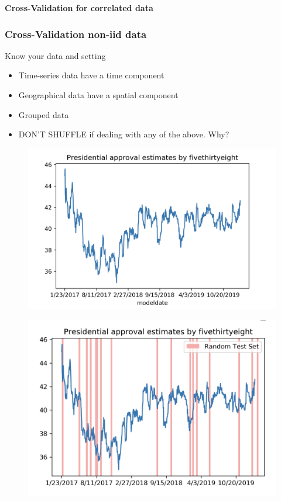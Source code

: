 \documentclass[compress, aspectratio=54]{beamer}
\begin{document}
\begin{frame}
\begin{center}
\Large{\textbf{Cross-Validation for correlated data}}
\end{center}
\end{frame}


\begin{frame}
\frametitle{Cross-Validation non-iid data}
Know your data and setting
\begin{itemize}
\item Time-series data have a time component 
\item Geographical data have a spatial component
\item Grouped data
\item DON'T SHUFFLE if dealing with any of the above. Why?
\end{itemize}
\end{frame}


\begin{frame}
\begin{figure}
\includegraphics[width=\linewidth ]{Figures/time-series.png}
\end{figure}
\end{frame}

\begin{frame}
\begin{figure}
\includegraphics[width=\linewidth ]{Figures/time-series-split.png}
\end{figure}
\end{frame}
\end{document}
